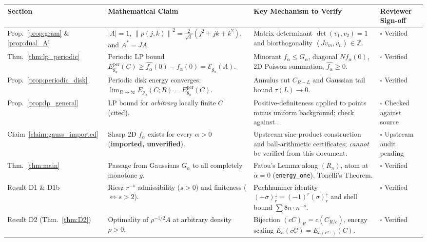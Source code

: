 \documentclass[11pt, a4paper]{article}
\theoremstyle{definition}
\theoremstyle{remark}
\newcommand{\Z}{\mathbb{Z}}
\newcommand{\Ecal}{\mathcal{E}}
\newcommand{\norm}[1]{\left\lVert #1 \right\rVert}
\newcommand{\abs}[1]{\left\lvert #1 \right\rvert}
\newcommand{\inner}[2]{\left\langle #1, #2 \right\rangle}
\begin{document}
\begin{table}[htbp]
\centering
\small
\begin{tabular}{@{}>{\raggedright\arraybackslash}p{2.2cm}>{\raggedright\arraybackslash}p{5.0cm}>{\raggedright\arraybackslash}p{5.2cm}>{\raggedright\arraybackslash}p{2.8cm}@{}}
\toprule
\textbf{Section} & \textbf{Mathematical Claim} & \textbf{Key Mechanism to Verify} & \textbf{Reviewer Sign-off} \\
\midrule
Prop.~\ref{prop:gram} \& \ref{prop:dual_A} & $\abs{A} = 1$, $\norm{p(j,k)}^2 = \frac{2}{\sqrt{3}}(j^2+jk+k^2)$, and $A^* = JA$. & Matrix determinant $\det(v_1, v_2) = 1$ and biorthogonality $\inner{Jv_m}{v_n} \in \Z$. & $\square$ Verified \\[0.6em]
Thm.~\ref{thm:lp_periodic} & Periodic LP bound $E_{g_\alpha}^{\text{per}}(C) \ge \widehat{f_\alpha}(0) - f_\alpha(0) = \Ecal_{g_\alpha}(A)$. & Minorant $f_\alpha \le G_\alpha$, diagonal $N f_\alpha(0)$, 2D Poisson summation, $\widehat{f_\alpha} \ge 0$. & $\square$ Verified \\[0.6em]
Prop.~\ref{prop:periodic_disk} & Periodic disk energy converges: $\lim_{R\to\infty} E_{g_\alpha}(C; R) = E_{g_\alpha}^{\text{per}}(C)$. & Annulus cut $C_{R-L}$ and Gaussian tail bound $\tau(L) \to 0$. & $\square$ Verified \\[0.6em]
Prop.~\ref{prop:lp_general} & LP bound for \emph{arbitrary} locally finite $C$ (cited). & Positive-definiteness applied to points minus uniform background; check against \cite[Prop.~2.2]{CdCI18}. & $\square$ Checked against source \\[0.6em]
Claim~\ref{claim:gauss_imported} & Sharp 2D $f_\alpha$ exists for every $\alpha > 0$ (\textbf{imported, unverified}). & Upstream sine-product construction and ball-arithmetic certificates; \emph{cannot} be verified from this document. & $\square$ Upstream audit pending \\[0.6em]
Thm.~\ref{thm:main} & Passage from Gaussians $G_\alpha$ to all completely monotone $g$. & Fatou's Lemma along $(R_n)$, atom at $\alpha=0$ (\texttt{energy\_one}), Tonelli's Theorem. & $\square$ Verified \\[0.6em]
Result D1 \& D1b & Riesz $r^{-s}$ admissibility ($s > 0$) and finiteness ($\iff s > 2$). & Pochhammer identity $(-\sigma)_r^\downarrow = (-1)^r (\sigma)_r^\uparrow$ and shell bound $\sum 8n \cdot n^{-s}$. & $\square$ Verified \\[0.6em]
Result D2 (Thm.~\ref{thm:D2}) & Optimality of $\rho^{-1/2} A$ at arbitrary density $\rho > 0$. & Bijection $(cC)_R = c(C_{R/c})$, energy scaling $E_h(cC) = E_{h(c^2 \cdot)}(C)$. & $\square$ Verified \\[0.6em]

\end{tabular}
\end{table}
\end{document}
